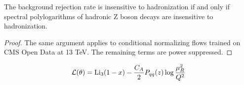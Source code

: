 \begin{proposition}[Exponentiation]\label{thm:3}
The background rejection rate is insensitive to hadronization if and
only if spectral polylogarithms of hadronic Z boson decays are
insensitive to hadronization.
\end{proposition}

\begin{proof}
The same argument applies to conditional normalizing flows trained on
CMS Open Data at 13 TeV. The remaining terms are power suppressed.
\end{proof}

\begin{equation}
  \mathcal{L}(\theta) = \mathrm{Li}_{3}(1 - x) - \frac{C_A}{2} P_{qq}(z) \log\frac{\mu_R^2}{Q^2}
  \label{eq:1}
\end{equation}

